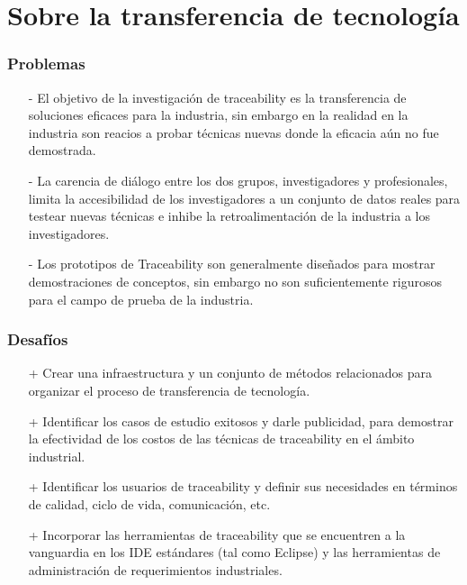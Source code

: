 \documentclass[a4paper,12pt,oneside]{book}
\begin{document}
\section{Sobre la transferencia de tecnología}

\subsubsection{Problemas}

\begin{itemize}

\item[-]     El objetivo de la investigación de traceability es la transferencia de soluciones eficaces para la industria, sin embargo en la realidad en la industria son reacios a probar técnicas nuevas donde la eficacia aún no fue demostrada.

\item[-]    La carencia de diálogo entre los dos grupos, investigadores y profesionales, limita la accesibilidad de los investigadores a un conjunto de datos reales para testear nuevas técnicas e inhibe la retroalimentación de la industria a los investigadores.

\item[-]    Los prototipos de Traceability son generalmente diseñados para mostrar demostraciones de conceptos, sin embargo no son suficientemente rigurosos para el campo de prueba de la industria.

\end{itemize}

\subsubsection{Desafíos}

\begin{itemize}

\item[+]     Crear una infraestructura y un conjunto de métodos relacionados para organizar el proceso de transferencia de tecnología.

\item[+]    Identificar los casos de estudio exitosos y darle publicidad, para demostrar la efectividad de los costos de las técnicas de traceability en el ámbito industrial.

\item[+]    Identificar los usuarios de traceability y definir sus necesidades en términos de calidad, ciclo de vida, comunicación, etc.

\item[+]    Incorporar las herramientas de traceability que se encuentren a la vanguardia en los IDE estándares (tal como Eclipse) y las herramientas de administración de requerimientos industriales.

\end{itemize}
\end{document}

